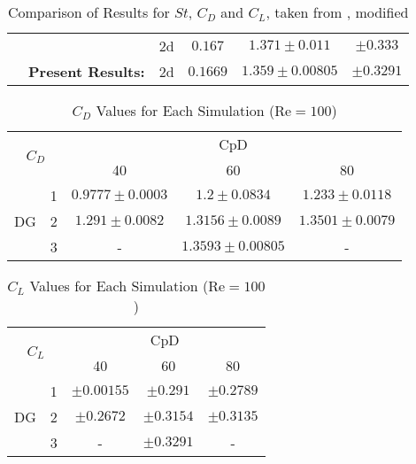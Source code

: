 \begin{table}[H]
\begin{tabular}{|l|p{3.5cm}|c|c|c|c|}
		\rule{0pt}{2,3ex}& \textcite{ayers}                  & \gls{2d}    &$ 0.167$     & $1.371 \pm 0.011 $ &$ \pm 0.333 $\\ \cline{2-6} 
		\rule{0pt}{2,3ex}& \textbf{Present Results:}                   & \gls{2d}    & $0.1669$     & $1.359 \pm 0.00805$  &  $\pm 0.3291$ \\ \hline
	\end{tabular}	
	\caption{Comparison of Results for $St$, $C_D$ and $C_L$, taken from \cite{ayers}, modified}
	\label{table100}
\end{table}



\begin{table}[H]
	\centering
	\def\arraystretch{1.5}
	\begin{tabular}{|c|c|c|c|c|}
		\hline
		\multicolumn{2}{|c|}{\multirow{2}{*}{$C_D$}} & \multicolumn{3}{c|}{CpD} \\ \cline{3-5} 
		\multicolumn{2}{|c|}{}                       & 40     & 60    & 80    \\ \hline
		\multirow{3}{*}{DG}            & 1           &   $0.9777\pm 0.0003$     &     $1.2 \pm 0.0834$  &     $1.233 \pm 0.0118$   \\ \cline{2-5} 
		& 2           &     $1.291 \pm 0.0082$   &   $1.3156 \pm 0.0089$    &     $1.3501 \pm 0.0079$   \\ \cline{2-5} 
		& 3           &      -  &     $1.3593 \pm 0.00805$   &     -   \\ \hline
	\end{tabular}
	\caption[$C_D$ Values for Each simulation]{$C_D$ Values for Each Simulation ($\text{Re} = 100$)}	
	\label{C_D100}
\end{table}
\begin{table}[H]
	\centering
	\def\arraystretch{1.5}
	\begin{tabular}{|c|c|c|c|c|}
		\hline
		\multicolumn{2}{|c|}{\multirow{2}{*}{$C_L$}} & \multicolumn{3}{c|}{CpD} \\ \cline{3-5} 
		\multicolumn{2}{|c|}{}                       & 40     & 60    & 80    \\ \hline
		\multirow{3}{*}{DG}            & 1           &    $\pm 0.00155$    &    $\pm 0.291$   &    $\pm 0.2789$    \\ \cline{2-5} 
		& 2           &     $\pm 0.2672$   &    $\pm 0.3154$   &     $\pm 0.3135$   \\ \cline{2-5} 
		& 3           &     -   &    $\pm 0.3291$  &    -    \\ \hline
	\end{tabular}
	\caption{$C_L$ Values for Each Simulation ($\text{Re} = 100$)}	
	\label{CL100}
\end{table}
